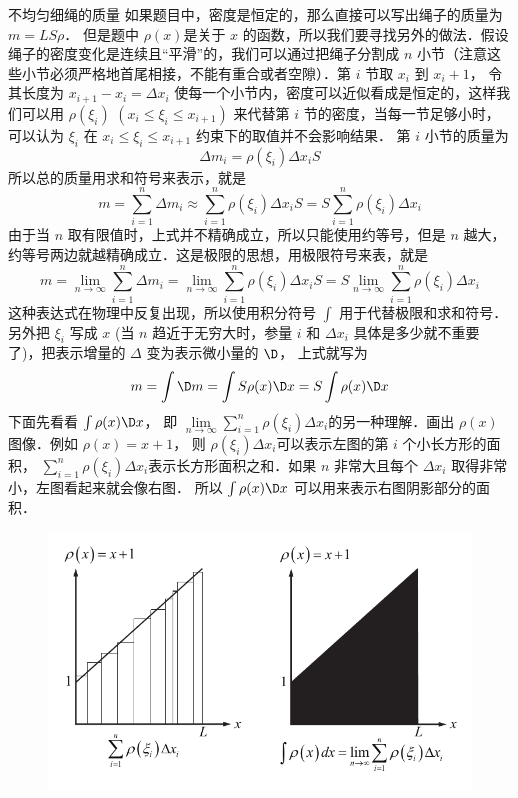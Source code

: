 \begin{exam}{不均匀细绳的质量}
如果题目中，密度是恒定的，那么直接可以写出绳子的质量为 $m = LS\rho$． 但是题中 $\rho(x)$是关于 $x$ 的函数，所以我们要寻找另外的做法．假设绳子的密度变化是连续且“平滑”的，我们可以通过把绳子分割成 $n$ 小节（注意这些小节必须严格地首尾相接，不能有重合或者空隙）．第 $i$ 节取 $x_i$ 到 $x_i +1$， 令其长度为 $x_{i + 1} - {x_i} = \Delta x_i$ 使每一个小节内，密度可以近似看成是恒定的，这样我们可以用 $\rho(\xi _i)\,\, (x_i \le \xi _i \le x_{i + 1})$ 来代替第 $i$ 节的密度，当每一节足够小时，可以认为 ${\xi _i}$ 在 ${x_i} \le {\xi _i} \le {x_{i + 1}}$ 约束下的取值并不会影响结果．
第 $i$ 小节的质量为
\begin{equation}
\Delta {m_i} = \rho (\xi _i)\Delta {x_i}S 
\end{equation}
所以总的质量用求和符号来表示，就是
\begin{equation}
m = \sum_{i = 1}^n \Delta m_i  \approx \sum_{i = 1}^n \rho(\xi _i)\Delta x_i S   = S \sum_{i = 1}^n \rho (\xi _i)\Delta x_i
\end{equation}
由于当 $n$ 取有限值时，上式并不精确成立，所以只能使用约等号，但是 $n$ 越大，约等号两边就越精确成立．这是极限的思想，用极限符号来表，就是
\begin{equation}
m = \lim_{n \to \infty } \sum_{i = 1}^n {\Delta {m_i}}  = \lim_{n \to \infty } \sum_{i = 1}^n {\rho(\xi _i)\Delta {x_i}S  }  = S   \lim_{n \to \infty } \sum_{i = 1}^n {\rho(\xi _i)\Delta {x_i} } 
\end{equation}
这种表达式在物理中反复出现，所以使用积分符号 $\int {} $ 用于代替极限和求和符号．另外把 ${\xi _i}$ 写成 $x$ (当 $n$ 趋近于无穷大时，参量 $i$ 和 $\Delta {x_i}$ 具体是多少就不重要了)，把表示增量的 $\Delta $ 变为表示微小量的 $\D$， 上式就写为
\begin{equation}
m = \int {\D m}  = \int {S\rho(x)\D x}  = S\int {\rho(x)\D x} 
\end{equation}
下面先看看 $\int {\rho(x)\D x} $， 即 $\lim\limits_{n \to \infty } \sum\limits_{i = 1}^n \rho(\xi _i)\Delta {x_i}$的另一种理解．画出 $\rho (x)$图像．例如 $\rho(x) = x + 1$， 则 $\rho(\xi _i)\Delta {x_i}$可以表示左图的第 $i$ 个小长方形的面积， $\sum\limits_{i = 1}^n \rho(\xi _i)\Delta {x_i}$表示长方形面积之和．如果 $n$ 非常大且每个 $\Delta {x_i}$ 取得非常小，左图看起来就会像右图． 所以 $\int \rho(x)\D x$ 可以用来表示右图阴影部分的面积．

\begin{figure}[ht]
\centering
\includegraphics[width=12cm]{./figures/Defint2.pdf}
\end{figure}


\end{exam}
